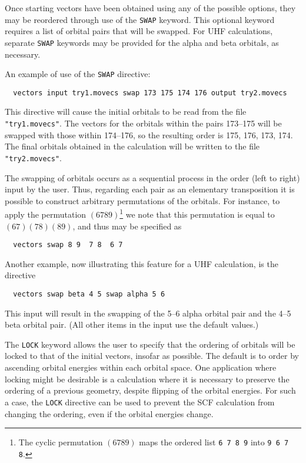 Once starting vectors have been obtained using any of the possible
options, they may be reordered through use of the \verb+SWAP+ keyword.
This optional keyword requires a list of orbital pairs that will be
swapped.  For UHF calculations, separate \verb+SWAP+ keywords may be
provided for the alpha and beta orbitals, as necessary.

An example of use of the \verb+SWAP+ directive:
\begin{verbatim}
  vectors input try1.movecs swap 173 175 174 176 output try2.movecs
\end{verbatim}
This directive will cause the initial orbitals to be read from the
file \verb+"try1.movecs"+.  The vectors for the orbitals within the
pairs 173--175 will be swapped with those within 174--176, so the
resulting order is 175, 176, 173, 174.  The final orbitals obtained in
the calculation will be written to the file \verb+"try2.movecs"+.

The swapping of orbitals occurs as a sequential process in the order
(left to right) input by the user.  Thus, regarding each pair as an
elementary transposition it is possible to construct arbitrary
permutations of the orbitals.  For instance, to apply the permutation
$(6 7 8 9)$\footnote{The cyclic permutation $(6 7 8 9)$ maps the
  ordered list \verb+6 7 8 9+ into \verb+9 6 7 8+.} we note that this
permutation is equal to $(6 7)(7 8)(8 9)$, and thus may be specified
as
\begin{verbatim}
  vectors swap 8 9  7 8  6 7
\end{verbatim}

Another example, now illustrating this feature for a UHF calculation,
is the directive
\begin{verbatim}
  vectors swap beta 4 5 swap alpha 5 6
\end{verbatim}
This input will result in the swapping of the 5--6 alpha orbital pair
and the 4--5 beta orbital pair.  (All other items in the input use the
default values.)

The \verb+LOCK+ keyword allows the user to specify that the ordering
of orbitals will be locked to that of the initial vectors, insofar as
possible. The default is to order by ascending orbital energies within
each orbital space. One application where locking might be desirable
is a calculation where it is necessary to preserve the ordering of a
previous geometry, despite flipping of the orbital energies.  For such
a case, the \verb+LOCK+ directive can be used to prevent the SCF
calculation from changing the ordering, even if the orbital energies
change.

